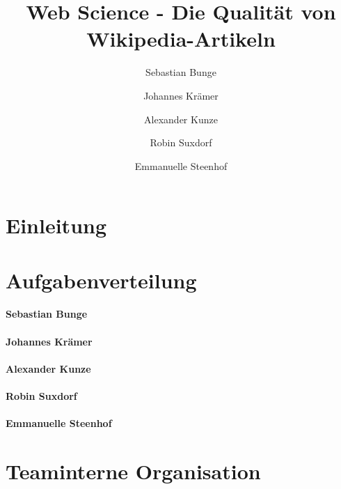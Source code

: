 \documentclass[researchlab,palatino]{AIGpaper}
\author{Sebastian Bunge \and Johannes Krämer \and Alexander Kunze \and Robin Suxdorf  \and Emmanuelle Steenhof }
\title{Web Science - Die Qualität von Wikipedia-Artikeln}
\begin{document}
\maketitle %


\section{Einleitung}


\section{Aufgabenverteilung}
\label{Aufgabenverteilung}


\paragraph{Sebastian Bunge}


\paragraph{Johannes Krämer}


\paragraph{Alexander Kunze}


\paragraph{Robin Suxdorf}


\paragraph{Emmanuelle Steenhof}


\section{Teaminterne Organisation}
\label{Organisation}

\end{document}
